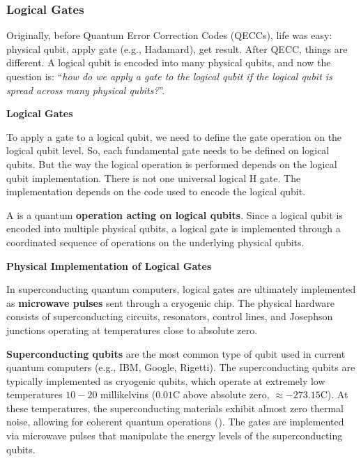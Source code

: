 \subsubsection{Logical Gates}\label{sec:logical-gates}

Originally, before Quantum Error Correction Codes (QECCs), life was easy: physical qubit, apply gate (e.g., Hadamard), get result. After QECC, things are different. A logical qubit is encoded into many physical qubits, and now the question is: ``\emph{how do we apply a gate to the logical qubit if the logical qubit is spread across many physical qubits?}''.

\highspace
\begin{flushleft}
    \textcolor{Green3}{ \textbf{Logical Gates}}
\end{flushleft}
To apply a gate to a logical qubit, we need to define the gate operation on the logical qubit level. So, each fundamental gate needs to be defined on logical qubits. But the way the logical operation is performed depends on the logical qubit implementation. There is not one universal logical H gate. The implementation depends on the code used to encode the logical qubit.

\highspace
\begin{definitionbox}
    A  is a quantum \textbf{operation acting on logical qubits}. Since a logical qubit is encoded into multiple physical qubits, a logical gate is implemented through a coordinated sequence of operations on the underlying physical qubits.
\end{definitionbox}

\highspace
\begin{flushleft}
    \textcolor{Green3}{ \textbf{Physical Implementation of Logical Gates}}
\end{flushleft}
In superconducting quantum computers, logical gates are ultimately implemented as \textbf{microwave pulses} sent through a cryogenic chip. The physical hardware consists of superconducting circuits, resonators, control lines, and Josephson junctions operating at temperatures close to absolute zero.

\highspace
\textbf{Superconducting qubits} are the most common type of qubit used in current quantum computers (e.g., IBM, Google, Rigetti). The superconducting qubits are typically implemented as cryogenic qubits, which operate at extremely low temperatures $10-20$ millikelvins ($0.01${\textdegree}C above absolute zero, $\approx -273.15${\textdegree}C). At these temperatures, the superconducting materials exhibit almost zero thermal noise, allowing for coherent quantum operations (). The gates are implemented via microwave pulses that manipulate the energy levels of the superconducting qubits.

